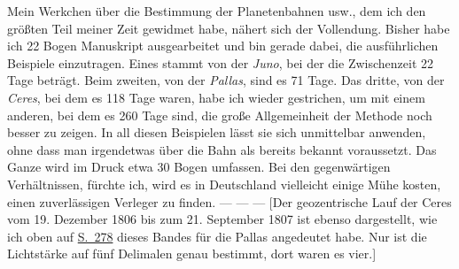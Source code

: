 \par\indent Mein Werkchen über die Bestimmung der Planetenbahnen usw., dem ich den größten Teil meiner Zeit gewidmet habe, nähert sich der Vollendung. Bisher habe ich 22 Bogen Manuskript ausgearbeitet und bin gerade dabei, die ausführlichen Beispiele einzutragen. Eines stammt von der \emph{Juno}, bei der die Zwischenzeit 22 Tage beträgt. Beim zweiten, von der \emph{Pallas}, sind es 71 Tage. Das dritte, von der \emph{Ceres}, bei dem es 118 Tage waren, habe ich wieder gestrichen, um mit einem anderen, bei dem es 260 Tage sind, die große Allgemeinheit der Methode noch besser zu zeigen. In all diesen Beispielen lässt sie sich unmittelbar anwenden, ohne dass man irgendetwas über die Bahn als bereits bekannt voraussetzt. Das Ganze wird im Druck etwa 30 Bogen umfassen. Bei den gegenwärtigen Verhältnissen, fürchte ich, wird es in Deutschland vielleicht einige Mühe kosten, einen zuverlässigen Verleger zu finden. --- --- --- [Der geozentrische Lauf der Ceres vom 19. Dezember 1806 bis zum 21. September 1807 ist ebenso dargestellt, wie ich oben auf \hyperlink{native-283}{S.~278} dieses Bandes für die Pallas angedeutet habe. Nur ist die Lichtstärke auf fünf Delimalen genau bestimmt, dort waren es vier.]
